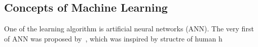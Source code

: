 \subsection{Concepts of Machine Learning}
One of the learning algorithm is artificial neural networks (ANN). The very first of ANN was proposed by~\citet{McCulloch_1943}, which was inspired by structre of human h